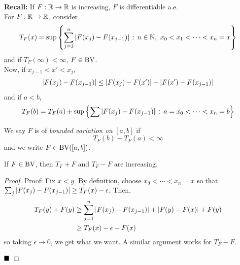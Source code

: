 
\textbf{Recall:} If $F : \R \to \R$ is increasing, $F$ is differentiable a.e.\\

For $F : \R \to \R$, consider
\[ T_F(x) = \sup\left\{\sum_{j = 1}^{n} \abs{F(x_j) - F(x_{j - 1})} \col n \in \N,\ x_0 < x_1 < \cdots < x_n = x\right\} \]
and if $T_F(\infty) < \infty$, $F \in \tt{BV}$.\\

Now, if $x_{j - 1} < x' < x_j$,
\[ \abs{F(x_j) - F(x_{j - 1})} \leq \abs{F(x_j) - F(x')} + \abs{F(x') - F(x_{j - 1})} \]
and if $a < b$,
\[ T_F(b) = T_F(a) + \sup\left\{\sum \abs{F(x_j) - F(x_{j - 1})} \col a = x_0 < \cdots < x_n = b\right\} \]

\begin{definition}
    We say $F$ is of \emph{bounded variation on $[a, b]$} if
    \[ T_F(b) - T_F(a) < \infty \]
    and we write $F \in \tt{BV}([a, b])$.
\end{definition}

\begin{lemma}
    If $F \in \tt{BV}$, then $T_F + F$ and $T_F - F$ are increasing.
\end{lemma}
\begin{proof}{Proof:}
    Fix $x < y$. By definition, choose $x_0 < \cdots < x_n = x$ so that $\sum_{j} \abs{F(x_j) - F(x_{j - 1})} \geq T_F(x) - \epsilon$. Then,
    \begin{align*}
        T_F(y) + F(y) &\geq \sum_{j = 1}^{n} \abs{F(x_j) - F(x_{j - 1})} + \abs{F(y) - F(x)} + F(y)\\
        &\geq T_F(x) - \epsilon + F(x)
    \end{align*}
    so taking $\epsilon \to 0$, we get what we want. A similar argument works for $T_{F} - F$. 

    $\qed$
\end{proof}

